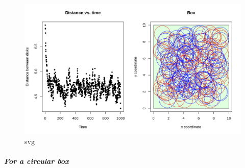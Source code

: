 \documentclass[11pt]{article}
\begin{document}
\begin{figure}
\centering
\includegraphics{output_17_1.svg}
\caption{svg}
\end{figure}

\hypertarget{for-a-circular-box}{%
\paragraph{\texorpdfstring{\emph{For a circular
box}}{For a circular box}}\label{for-a-circular-box}}
\end{document}
